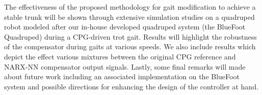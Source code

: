 The effectiveness of the proposed methodology for gait modification to achieve a stable trunk will be shown through extensive 
simulation studies on a quadruped robot modeled after our in-house developed quadruped system (the BlueFoot Quadruped) during a 
CPG-driven trot gait. Results will highlight the robustness of the compensator during gaits at various speeds. We also include results
which depict the effect various mixtures between the original CPG reference and NARX-NN compensator output signals.
Lastly, some final remarks will made about future work including an associated implementation on the BlueFoot 
system and possible directions for enhancing the design of the controller at hand.